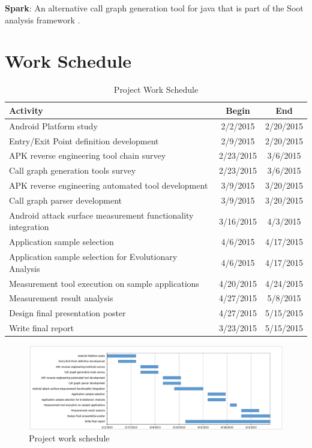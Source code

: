 \documentclass[conference]{IEEEtran}
\begin{document}
\textbf{Spark}: An alternative call graph generation tool for java that is part of the Soot analysis framework \cite{soot_framework} \cite{Lam_thesoot}.

\section{Work Schedule}

\begin{table}[!t]
\renewcommand{\arraystretch}{1.3}
\caption{Project Work Schedule}
\label{tab:schedule}
\centering
\begin{tabular}{|l|c|c|}
\hline
Activity & Begin & End \\
\hline
Android Platform study & 2/2/2015 & 2/20/2015 \\ 
\hline 
Entry/Exit Point definition development & 2/9/2015 & 2/20/2015 \\
\hline 
APK reverse engineering tool chain survey & 2/23/2015 & 3/6/2015 \\
\hline 
Call graph generation tools survey & 2/23/2015 & 3/6/2015 \\
\hline 
APK reverse engineering automated tool development & 3/9/2015 & 3/20/2015 \\
\hline 
Call graph parser development & 3/9/2015 & 3/20/2015 \\
\hline 
Android attack surface measurement functionality integration & 3/16/2015 & 4/3/2015 \\
\hline 
Application sample selection & 4/6/2015 & 4/17/2015 \\
\hline 
Application sample selection for Evolutionary Analysis & 4/6/2015 & 4/17/2015 \\
\hline 
Measurement tool execution on sample applications & 4/20/2015 & 4/24/2015 \\
\hline 
Measurement result analysis & 4/27/2015 & 5/8/2015 \\
\hline 
Design final presentation poster & 4/27/2015 & 5/15/2015 \\
\hline 
Write final report & 3/23/2015 & 5/15/2015 \\
\hline 
\end{tabular}
\end{table}

\begin{figure}
  \centering
  \includegraphics[scale=0.45]{figs/schedule.png}
  \caption{Project work schedule}
  \label{fig:schedule}
\end{figure}
\end{document}
